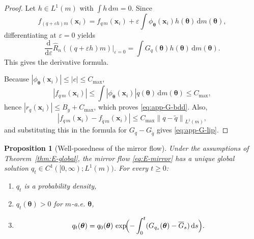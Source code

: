 \documentclass[11pt,a4paper]{article}
\newtheorem{proposition}[theorem]{Proposition}
\theoremstyle{definition}
\theoremstyle{remark}
\newcommand{\vtheta}{\boldsymbol{\theta}}
\newcommand{\vx}{\mathbf{x}}
\newcommand{\dd}{\mathrm{d}}
\newcommand{\norm}[1]{\left\|#1\right\|}
\newcommand{\abs}[1]{\left|#1\right|}
\begin{document}
\begin{proof}
  Let \(h \in L^1(m)\) with \(\int h\,\dd m=0\).
  Since
  \[
    f_{(q+\varepsilon h)m}(\vx_i)
    =
    f_{q\,m}(\vx_i)
    + \varepsilon
    \int \phi_{\vtheta}(\vx_i)h(\vtheta)\,\dd m(\vtheta),
  \]
  differentiating at \(\varepsilon=0\) yields
  \[
    \frac{\dd}{\dd\varepsilon}
    \hat R_n((q+\varepsilon h)m)\Big|_{\varepsilon=0}
    =
    \int G_q(\vtheta)h(\vtheta)\,\dd m(\vtheta).
  \]
  This gives the derivative formula.

  Because \(\abs{\phi_{\vtheta}(\vx_i)} \le \abs{c}
  \le C_{\max}\),
  \[
    \abs{f_{q\,m}(\vx_i)}
    \le
    \int \abs{\phi_{\vtheta}(\vx_i)}q(\vtheta)\,\dd m(\vtheta)
    \le C_{\max},
  \]
  hence
  \(
    \abs{r_q(\vx_i)} \le B_y + C_{\max}
  \),
  which proves \eqref{eq:app-G-bdd}.
  Also,
  \[
    \abs{f_{q\,m}(\vx_i)-f_{\tilde q\,m}(\vx_i)}
    \le
    C_{\max}\norm{q-\tilde q}_{L^1(m)},
  \]
  and substituting this in the formula for
  \(G_q-G_{\tilde q}\) gives
  \eqref{eq:app-G-lip}.
\end{proof}

\begin{proposition}[Well-posedness of the mirror flow]
  \label{prop:E-wellposed}
  Under the assumptions of
  Theorem~\ref{thm:E-global}, the mirror flow
  \eqref{eq:E-mirror} has a unique global
  solution \(q_t \in C^1([0,\infty);L^1(m))\).
  For every \(t\ge 0\):
  \begin{enumerate}[label=(\alph*),nosep]
    \item \(q_t\) is a probability density,
    \item \(q_t(\vtheta) > 0\) for \(m\)-a.e.
    \(\vtheta\),
    \item
    \[
      q_t(\vtheta)
      =
      q_0(\vtheta)\,
      \exp\!\Bigl(
        -\int_0^t
        (G_{q_s}(\vtheta)-\overline G_s)\,\dd s
      \Bigr).
    \]
  \end{enumerate}
\end{proposition}
\end{document}
